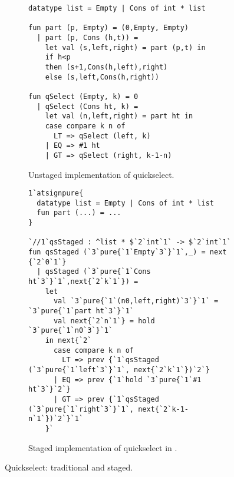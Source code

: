 
\begin{figure*}
\begin{subfigure}{0.5\textwidth}
\begin{lstlisting} 
datatype list = Empty | Cons of int * list

fun part (p, Empty) = (0,Empty, Empty) 
  | part (p, Cons (h,t)) = 
    let val (s,left,right) = part (p,t) in 
    if h<p 
    then (s+1,Cons(h,left),right) 
    else (s,left,Cons(h,right))

fun qSelect (Empty, k) = 0
  | qSelect (Cons ht, k) =
    let val (n,left,right) = part ht in
    case compare k n of
      LT => qSelect (left, k)
    | EQ => #1 ht
    | GT => qSelect (right, k-1-n)
\end{lstlisting}
\caption{Unstaged implementation of quickselect.}
\label{fig:qs-unstaged}
\end{subfigure}
\begin{subfigure}{0.5\textwidth}
\begin{lstlisting} 
1`atsignpure{
  datatype list = Empty | Cons of int * list
  fun part (...) = ...
} 

`//1`qsStaged : ^list * $`2`int`1` -> $`2`int`1`
fun qsStaged (`3`pure{`1`Empty`3`}`1`,_) = next {`2`0`1`}
  | qsStaged (`3`pure{`1`Cons ht`3`}`1`,next{`2`k`1`}) = 
    let 
      val `3`pure{`1`(n0,left,right)`3`}`1` = `3`pure{`1`part ht`3`}`1`
      val next{`2`n`1`} = hold `3`pure{`1`n0`3`}`1`
    in next{`2`
      case compare k n of
        LT => prev {`1`qsStaged (`3`pure{`1`left`3`}`1`, next{`2`k`1`})`2`}
      | EQ => prev {`1`hold `3`pure{`1`#1 ht`3`}`2`}
      | GT => prev {`1`qsStaged (`3`pure{`1`right`3`}`1`, next{`2`k-1-n`1`})`2`}`1`
    }`
\end{lstlisting}
\caption{Staged implementation of quickselect in \lang.}
\label{fig:qs-staged}
\end{subfigure}
\caption{Quickselect: traditional and staged.}
\end{figure*}


